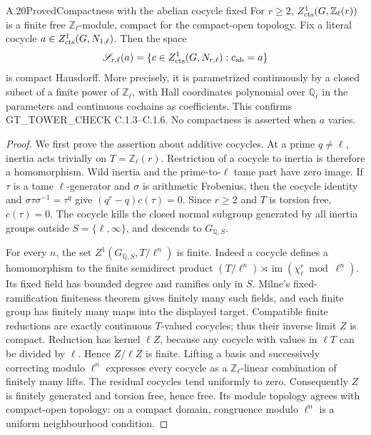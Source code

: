 \begin{result}{A.20}{Proved}{Compactness with the abelian cocycle fixed}
\label{coh:compact}
For $r\geq2$, $Z^1_{\rm cts}(G,\mathbb Z_\ell(r))$ is a finite
free $\mathbb Z_\ell$-module, compact for the compact-open topology.
Fix a literal cocycle $a\in Z^1_{\rm cts}(G,N_{1,\ell})$.
Then the space
\[
 \mathscr S_{r,\ell}(a)=
 \{c\in Z^1_{\rm cts}(G,N_{r,\ell}):c_{\rm ab}=a\}
\]
is compact Hausdorff. More precisely, it is parametrized continuously by
a closed subset of a finite power of $\mathbb Z_\ell$, with Hall
coordinates polynomial over $\mathbb Q_\ell$ in the parameters and
continuous cochains as coefficients. This confirms
GT\_TOWER\_CHECK C.1.3--C.1.6. No compactness is asserted when $a$
varies.
\end{result}
\begin{proof}
We first prove the assertion about additive cocycles. At a prime
$q\ne\ell$, inertia acts trivially on $T=\mathbb Z_\ell(r)$.
Restriction of a cocycle to inertia is therefore a homomorphism. Wild
inertia and the prime-to-$\ell$ tame part have zero image. If $\tau$
is a tame $\ell$-generator and $\sigma$ is arithmetic Frobenius,
then the cocycle identity and $\sigma\tau\sigma^{-1}=\tau^q$ give
$(q^r-q)c(\tau)=0$. Since $r\geq2$ and $T$ is torsion free,
$c(\tau)=0$. The cocycle kills the closed normal subgroup generated by
all inertia groups outside $S=\{\ell,\infty\}$, and descends to
$G_{\mathbb Q,S}$.

For every $n$, the set $Z^1(G_{\mathbb Q,S},T/\ell^n)$ is finite.
Indeed a cocycle defines a homomorphism to the finite semidirect product
$(T/\ell^n)\rtimes\operatorname{im}(\chi_\ell^r\bmod\ell^n)$.
Its fixed field has bounded degree and ramifies only in $S$.
Milne's fixed-ramification finiteness theorem
\cite[Theorem 8.42, p.151]{CohMilneANT} gives finitely many such fields,
and each finite group has finitely many maps into the displayed target.
Compatible finite reductions are exactly continuous $T$-valued cocycles;
thus their inverse limit $Z$ is compact. Reduction has kernel $\ell Z$,
because any cocycle with values in $\ell T$ can be divided by $\ell$.
Hence $Z/\ell Z$ is finite. Lifting a basis and successively correcting
modulo $\ell^n$ expresses every cocycle as a $\mathbb Z_\ell$-linear
combination of finitely many lifts. The residual cocycles tend uniformly
to zero. Consequently $Z$ is finitely generated and torsion free, hence
free. Its module topology agrees with compact-open topology: on a compact
domain, congruence modulo $\ell^n$ is a uniform neighbourhood condition.


\end{proof}
